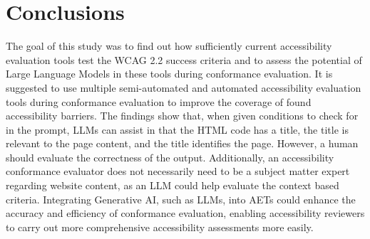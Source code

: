 \chapter{Conclusions\label{conclusions}}

The goal of this study was to find out how sufficiently current accessibility evaluation tools test the WCAG 2.2 success criteria and to assess the potential of Large Language Models in these tools during conformance evaluation. It is suggested to use multiple semi-automated and automated accessibility evaluation tools during conformance evaluation to improve the coverage of found accessibility barriers. The findings show that, when given conditions to check for in the prompt, LLMs can assist in that the HTML code has a title, the title is relevant to the page content, and the title identifies the page. However, a human should evaluate the correctness of the output. Additionally, an accessibility conformance evaluator does not necessarily need to be a subject matter expert regarding website content, as an LLM could help evaluate the context based criteria. Integrating Generative AI, such as LLMs, into AETs could enhance the accuracy and efficiency of conformance evaluation, enabling accessibility reviewers to carry out more comprehensive accessibility assessments more easily.


